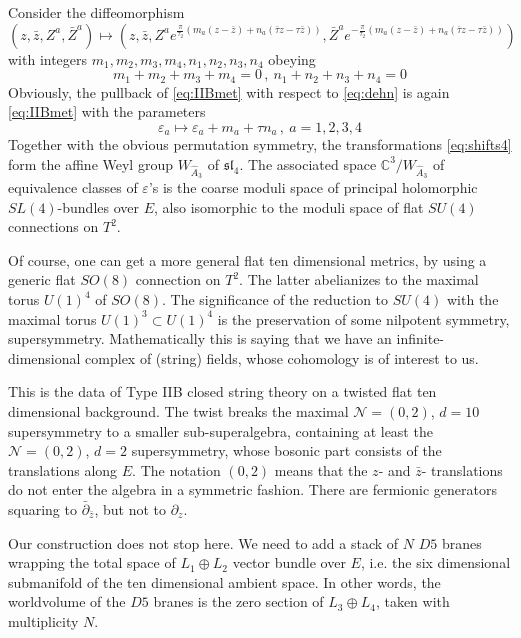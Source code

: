 \documentclass[12pt]{article}
\numberwithin{equation}{section}
\newcommand{\ve}{{\varepsilon}}
\newcommand\beq{\begin{equation}}
\newcommand\eeq{\end{equation}}
\theoremstyle{definition}
\newcommand {\BC}   {\mathbb C}
\newcommand {\CalN} {\mathcal N}
\begin{document}
Consider the diffeomorphism
\beq
(z, {\bar z},  Z^a, {\bar Z}^a) \mapsto \left(z, {\bar z}, Z^a e^{\frac{\pi}{\tau_2} \left( m_a (z-{\bar z}) + n_a ({\bar\tau}{ z} - {\tau} {\bar z} ) \right)} , {\bar Z}^{a} e^{-\frac{\pi}{\tau_2} \left( m_a (z-{\bar z}) + n_a ({\bar\tau}{ z} - {\tau} {\bar z} ) \right)} \right)
\label{eq:dehn}
\eeq
with integers $m_1, m_2, m_3, m_4, n_1, n_2, n_3,n_4$ obeying 
\beq
m_1 + m_2 + m_3 + m_4 = 0\, , \ n_1 + n_2 + n_3 + n_4 = 0 
\eeq
Obviously, the pullback of \eqref{eq:IIBmet} with respect to \eqref{eq:dehn} is again \eqref{eq:IIBmet} with the parameters
\beq
{\ve}_{a} \mapsto {\ve}_{a} + m_{a} + {\tau} n_{a}\, , \ a = 1, 2, 3, 4
\label{eq:shifts4}
\eeq
Together with the obvious permutation symmetry, the transformations \eqref{eq:shifts4} form the affine Weyl group $W_{{\hat A}_3}$ of $\mathfrak{sl}_4$. The associated  space ${\BC}^{3}/W_{{\hat A}_3}$ of equivalence classes of $\ve$'s  is the coarse moduli space of principal holomorphic $SL(4)$-bundles over $E$, also isomorphic to the moduli space of flat $SU(4)$
connections on $T^2$.  

Of course, one can get a more general flat ten dimensional metrics, by using a generic flat $SO(8)$
connection on $T^2$. The latter abelianizes to the maximal torus $U(1)^4$ of $SO(8)$. The significance of the reduction to $SU(4)$ with the maximal torus $U(1)^3 \subset U(1)^4$ is the 
preservation of some nilpotent symmetry, supersymmetry. Mathematically this is saying that
we have an infinite-dimensional complex of (string) fields, whose cohomology is of interest to us. 

This is the data of Type IIB closed string theory on a twisted flat ten dimensional background. 
The twist breaks the maximal ${\CalN}=(0,2)$, $d=10$ supersymmetry to a smaller sub-superalgebra, containing at least the ${\CalN}=(0,2)$, $d=2$ supersymmetry, whose bosonic part consists of  the translations along $E$. The notation $(0,2)$ means that the $z$- and ${\bar z}$- translations do not enter the algebra in a symmetric fashion. There are fermionic generators squaring to ${\bar\partial}_{\bar z}$, but not to ${\partial}_{z}$. 

Our construction does not stop here. We need to add a stack of $N$ $D5$ branes wrapping the total space of $L_{1} \oplus L_{2}$ vector bundle over $E$, i.e. the six dimensional submanifold of the ten dimensional ambient space. In other words, the worldvolume of the $D5$ branes is the zero section of $L_3 \oplus L_4$, taken with multiplicity $N$. 
\end{document}
